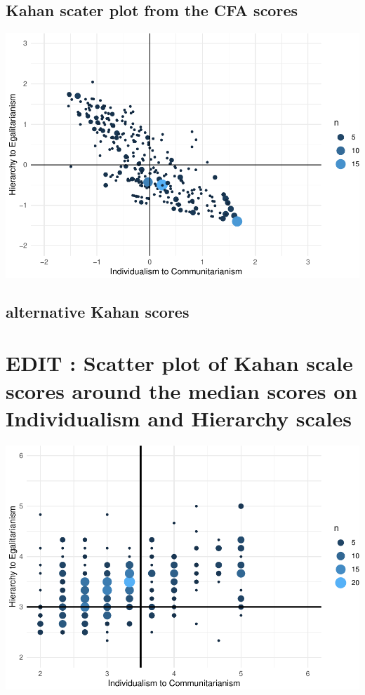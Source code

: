 \documentclass[
]{article}
\begin{document}
\newpage

\hypertarget{kahan-scater-plot-from-the-cfa-scores}{%
\subsection{Kahan scater plot from the CFA
scores}\label{kahan-scater-plot-from-the-cfa-scores}}

\includegraphics{Paper1_files/figure-latex/unnamed-chunk-15-1.pdf}

\hypertarget{alternative-kahan-scores}{%
\subsection{alternative Kahan scores}\label{alternative-kahan-scores}}

\hypertarget{edit-scatter-plot-of-kahan-scale-scores-around-the-median-scores-on-individualism-and-hierarchy-scales}{%
\section{EDIT : Scatter plot of Kahan scale scores around the median
scores on Individualism and Hierarchy
scales}\label{edit-scatter-plot-of-kahan-scale-scores-around-the-median-scores-on-individualism-and-hierarchy-scales}}

\includegraphics{Paper1_files/figure-latex/unnamed-chunk-17-1.pdf}
\end{document}
